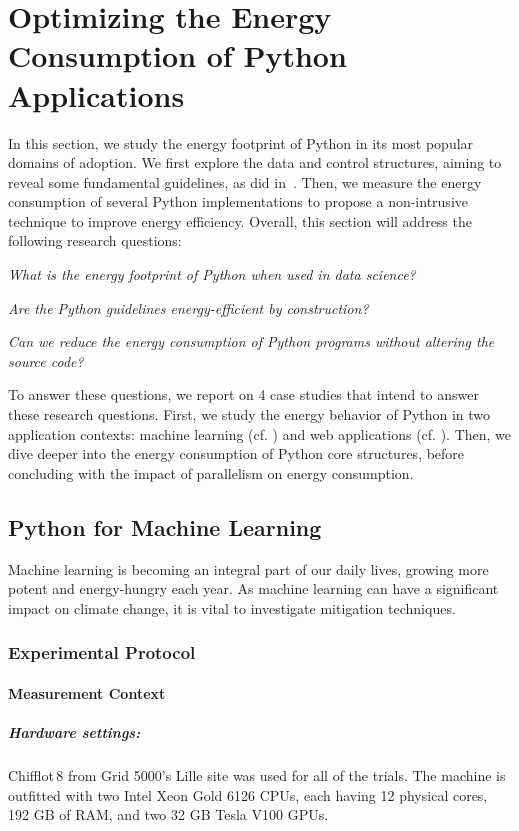 \section{Optimizing the Energy Consumption of Python Applications}\label{python:sec_insights}
In this section, we study the energy footprint of Python in its most popular domains of adoption.
We first explore the data and control structures, aiming to reveal some fundamental guidelines, as \citeauthor{hasan_energy_2016} did in~\cite{hasan_energy_2016}.
Then, we measure the energy consumption of several Python implementations to propose a non-intrusive technique to improve energy efficiency.
Overall, this section will address the following research questions:
\begin{compactenum}[\indent\bf RQ\,1:]
    \item \emph{What is the energy footprint of Python when used in data science?}
    \item \emph{Are the Python guidelines energy-efficient by construction?}
    \item \emph{Can we reduce the energy consumption of Python programs without altering the source code?}
\end{compactenum}

To answer these questions, we report on 4 case studies that intend to answer these research questions.
First, we study the energy behavior of Python in two application contexts: machine learning (cf. ) and web applications (cf. ).
Then, we dive deeper into the energy consumption of Python core structures, before concluding with the impact of parallelism on energy consumption.

\subsection{Python for Machine Learning}\label{sec:ml}
Machine learning is becoming an integral part of our daily lives, growing more potent and energy-hungry each year.
As machine learning can have a significant impact on climate change, it is vital to investigate mitigation techniques.

\subsubsection{Experimental Protocol}
\paragraph{Measurement Context}
\subparagraph{Hardware settings:}
Chifflot\,8 from Grid 5000's Lille site was used for all of the trials.
The machine is outfitted with two Intel Xeon Gold 6126 CPUs, each having 12 physical cores, 192 GB of RAM, and two 32 GB Tesla V100 GPUs.

